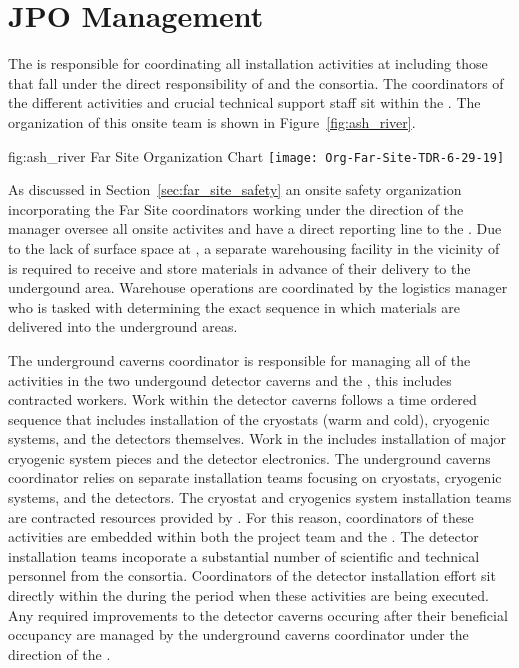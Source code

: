 \section{JPO Management}
\label{vl:tc-facility_mgmt}

The  is responsible for coordinating all 
installation activities at  including those that fall 
under the direct responsibility of  and the  
consortia.  The coordinators of the different activities and crucial 
technical support staff sit within the .  The organization
of this onsite team is shown in Figure~\ref{fig:ash_river}.  
\begin{dunefigure}{fig:ash_river}
  {Far Site Organization Chart}
  \texttt{[image: Org-Far-Site-TDR-6-29-19]}
\end{dunefigure}
 
As discussed in Section~\ref{sec:far_site_safety} an onsite safety 
organization incorporating the Far Site  coordinators
working under the direction of the  
 manager oversee all onsite activites and have a direct 
reporting line to the .  Due to the lack of surface space 
at , a separate warehousing facility in the vicinity of 
 is required to receive and store materials in advance 
of their delivery to the undergound area.  Warehouse operations are 
coordinated by the  logistics manager who is tasked 
with determining the exact sequence in which materials are delivered
into the underground areas.         

The underground caverns coordinator is responsible for managing all 
of the activities in the two undergound detector caverns and
the , this includes contracted workers.  Work within the detector caverns follows a time 
ordered sequence that includes installation of the cryostats (warm
and cold), cryogenic systems, and the detectors themselves.  Work 
in the  includes installation of major cryogenic system 
pieces and the detector  electronics.  The underground 
caverns coordinator relies on separate installation teams focusing 
on cryostats, cryogenic systems, and the detectors.  The cryostat 
and cryogenics system installation teams are contracted resources 
provided by .  For this reason, coordinators of these 
activities are embedded within both the  project team 
and the .  The detector installation teams incoporate a 
substantial number of scientific and technical personnel from the 
 consortia.  Coordinators of the detector installation 
effort sit directly within the  during the period when 
these activities are being executed.  Any required improvements
to the detector caverns occuring after their beneficial 
occupancy are managed by the underground caverns coordinator  
under the direction of the .

